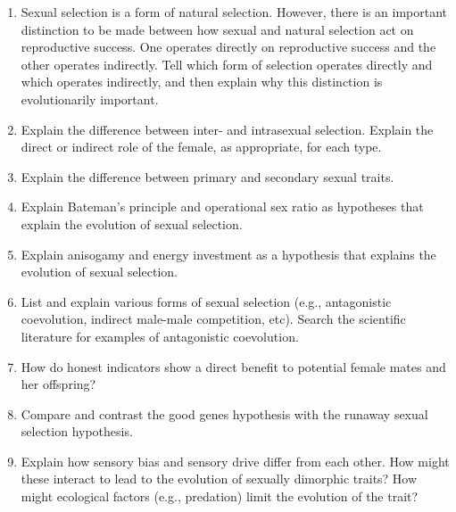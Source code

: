 \documentclass[letterpaper]{tufte-handout}
\begin{document}
\begin{enumerate}
	
	\item Sexual selection is a form of natural selection.  However, there is an important distinction to be made between how sexual and natural selection act on reproductive success.  One operates directly on reproductive success and the other operates indirectly. Tell which form of selection operates directly and which operates indirectly, and then explain why this distinction is evolutionarily important.
	
	\item Explain the difference between inter- and intrasexual selection.  Explain the direct or indirect role of the female, as appropriate, for each type.

	\item Explain the difference between primary and secondary sexual traits.
	
	\item Explain Bateman's principle and operational sex ratio as hypotheses that explain the evolution of sexual selection.

	\item Explain anisogamy and energy investment as a hypothesis that explains the evolution of sexual selection.

	\item List and explain various forms of sexual selection (e.g., antagonistic coevolution, indirect male-male competition, etc). Search the scientific literature for examples of antagonistic coevolution.
	
	\item How do honest indicators show a direct benefit to potential female mates and her offspring?

	\item Compare and contrast the good genes hypothesis with the runaway sexual selection hypothesis.  


	\item Explain how sensory bias and sensory drive differ from each other.  How might these interact to lead to the evolution of sexually dimorphic traits?  How might ecological factors (e.g., predation) limit the evolution of the trait?


\end{enumerate}
\end{document}
